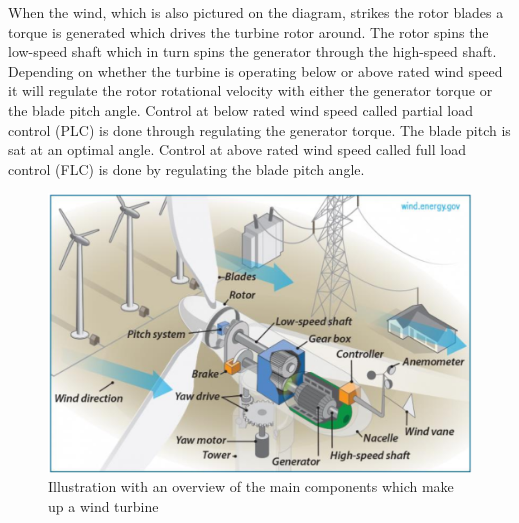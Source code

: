 When the wind, which is also pictured on the diagram, strikes the rotor blades a torque is generated which drives the turbine rotor around. The rotor spins the low-speed shaft which in turn spins the generator through the high-speed shaft. Depending on whether the turbine is operating below or above rated wind speed it will regulate the rotor rotational velocity with either the generator torque or the blade pitch angle. Control at below rated wind speed called partial load control (PLC) is done through regulating the generator torque. The blade pitch is sat at an optimal angle. Control at above rated wind speed called full load control (FLC) is done by regulating the blade pitch angle.
\begin{figure}[h]
	\centering
	\includegraphics[width=0.7\linewidth]{Graphics/WtComponents.png}
	\caption{Illustration with an overview of the main components which make up a wind turbine}
	\label{fig:wt_components}
\end{figure}

